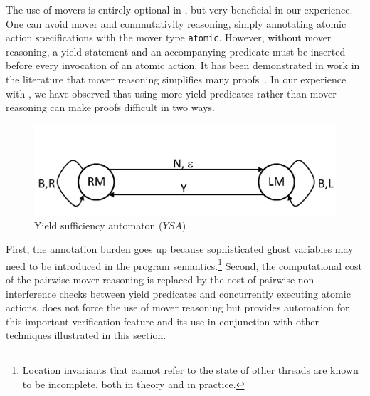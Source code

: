 The use of movers is entirely optional in \civl, but very beneficial
in our experience. One can avoid 
mover and commutativity reasoning, simply
annotating atomic action specifications with the mover type {\tt atomic}.
However, without mover reasoning,  a yield statement and an
accompanying predicate
must be inserted before every invocation of an atomic action.
It has been demonstrated in work in the literature that mover
reasoning simplifies many proofs~\cite{ElmasQT09}. 
In our experience with \civl, we have observed that using more yield
predicates rather than mover reasoning can make proofs difficult in two ways.
\begin{figure}
\vspace*{-1cm}
\begin{center}
\includegraphics[scale=0.25]{YieldTypeCheckingAutomaton.pdf}
\end{center} 
\vspace*{-0.3cm}
\caption{Yield sufficiency automaton ($YSA$)}
\label{fig:ysa}
\end{figure}
First, the annotation burden goes up because sophisticated ghost variables may need to be introduced in the 
program semantics.\footnote{Location invariants that cannot refer to the state of other threads are known to be incomplete, 
both in theory and in practice.}
Second, the computational cost of the pairwise mover reasoning is replaced by the cost of pairwise non-interference checks between yield predicates 
and concurrently executing atomic actions. 
\civl does not force the use of mover
reasoning but provides automation for this important verification
feature and its use in conjunction with other techniques illustrated in
this section. 

